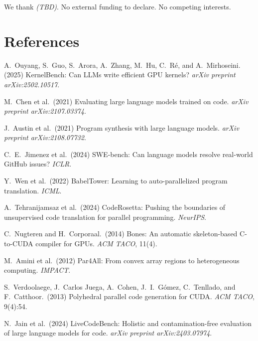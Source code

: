 \documentclass{article}
\begin{document}
\begin{ack}
We thank \emph{(TBD)}. No external funding to declare. No competing interests.
\end{ack}

\section*{References}

\medskip
{\small

A.\ Ouyang, S.\ Guo, S.\ Arora, A.\ Zhang, M.\ Hu, C.\ R\'e, and A.\ Mirhoseini.
(2025) KernelBench: Can LLMs write efficient GPU kernels?
{\it arXiv preprint arXiv:2502.10517}.

M.\ Chen et al.\ (2021) Evaluating large language models trained on code.
{\it arXiv preprint arXiv:2107.03374}.

J.\ Austin et al.\ (2021) Program synthesis with large language models.
{\it arXiv preprint arXiv:2108.07732}.

C.\ E.\ Jimenez et al.\ (2024) SWE-bench: Can language models resolve
real-world GitHub issues?
{\it ICLR}.

Y.\ Wen et al.\ (2022) BabelTower: Learning to auto-parallelized program
translation.
{\it ICML}.

A.\ Tehranijamsaz et al.\ (2024) CodeRosetta: Pushing the boundaries of
unsupervised code translation for parallel programming.
{\it NeurIPS}.

C.\ Nugteren and H.\ Corporaal.\ (2014) Bones: An automatic skeleton-based
C-to-CUDA compiler for GPUs.
{\it ACM TACO}, 11(4).

M.\ Amini et al.\ (2012) Par4All: From convex array regions to heterogeneous
computing.
{\it IMPACT}.

S.\ Verdoolaege, J.\ Carlos Juega, A.\ Cohen, J.\ I.\ G\'omez, C.\ Tenllado,
and F.\ Catthoor.\ (2013) Polyhedral parallel code generation for CUDA.
{\it ACM TACO}, 9(4):54.

N.\ Jain et al.\ (2024) LiveCodeBench: Holistic and contamination-free evaluation
of large language models for code.
{\it arXiv preprint arXiv:2403.07974}.

}
\end{document}

